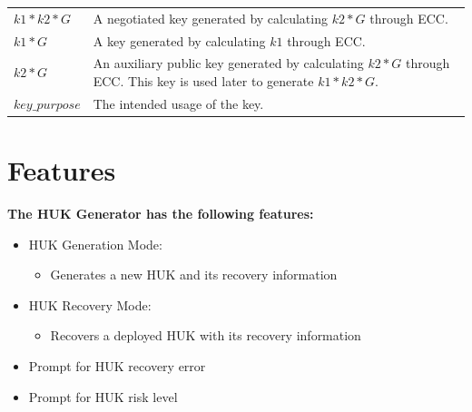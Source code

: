 \documentclass[main\_\_EN.tex]{subfiles}
\begin{document}
\begin{longtable}[c]{ R{6cm} p{10cm} }
\textbf{\begin{math}k1*k2*G\end{math}} \label{para:k1k2G} & A negotiated key generated by calculating \begin{math}k2*G\end{math} through ECC.\\
\textbf{\begin{math}k1*G\end{math}} \label{para:k1G} & A key generated by calculating \begin{math}k1\end{math} through ECC.\\
\textbf{\begin{math}k2*G\end{math}} & An auxiliary public key generated by calculating \begin{math}k2*G\end{math} through ECC. This key is used later to generate \begin{math}k1*k2*G\end{math}.\\
\textbf{\begin{math}key\_purpose\end{math}} \label{para:k2G}& The intended usage of the key.\\
\end{longtable}


\section{Features}
\label{sec:keymng-features}

\textbf{The HUK Generator has the following features:}
\begin{itemize}
    \item HUK Generation Mode:
    \begin{itemize}
        \item Generates a new HUK and its recovery information
    \end{itemize}
    \item HUK Recovery Mode:
    \begin{itemize}
        \item Recovers a deployed HUK with its recovery information
    \end{itemize}
    \item Prompt for HUK recovery error
    \item Prompt for HUK risk level
\end{itemize}
\end{document}
